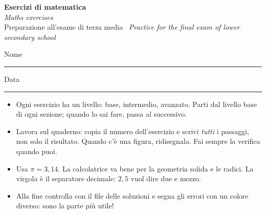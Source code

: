 \def\modoesercizi{}      %




\begin{center}
{\LARGE\bfseries\color{navy} Esercizi di matematica}\\[3pt]
{\large\itshape\color{engray} Maths exercises}\\[6pt]
{\normalsize Preparazione all'esame di terza media \textperiodcentered\ \textit{\color{engray}Practice for the final exam of lower secondary school}}
\end{center}
\vspace{2pt}
\noindent Nome \ \rule{6cm}{0.4pt}\hfill Data \ \rule{3.5cm}{0.4pt}

\begin{tcolorbox}[colback=navy!4, colframe=navy!50, boxrule=0.5pt, arc=2pt, left=6pt, right=6pt, top=4pt, bottom=4pt,
  title={Come lavorare \textperiodcentered\ \itshape How to work}, fonttitle=\bfseries\small, colbacktitle=navy!70]
\begin{itemize}[leftmargin=1.2em]
\item Ogni esercizio ha un livello:  base,  intermedio,  avanzato. Parti dal livello base di ogni sezione; quando lo sai fare, passa al successivo.
\item Lavora sul quaderno: copia il numero dell'esercizio e scrivi \emph{tutti} i passaggi, non solo il risultato. Quando c'è una figura, ridisegnala. Fai sempre la verifica quando puoi.
\item Usa $\pi=3,14$. La calcolatrice va bene per la geometria solida e le radici. La virgola è il separatore decimale: $2,5$ vuol dire due e mezzo.
\item Alla fine controlla con il file delle soluzioni e segna gli errori con un colore diverso: sono la parte più utile!
\end{itemize}
\end{tcolorbox}

